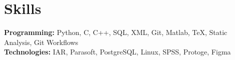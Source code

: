 \documentclass{../templates/simplecv}
\begin{document}
\section{Skills}
\vspace{3pt}
\resumeSubHeadingListStart
\small{\item{
    \textbf{Programming: }{Python, C, C++, SQL, XML, Git, Matlab, TeX, Static Analysis, Git Workflows} \\ \vspace{3pt}
    \textbf{Technologies: }{IAR, Parasoft, PostgreSQL, Linux, SPSS, Protoge, Figma}
}}
\resumeSubHeadingListEnd
\end{document}
